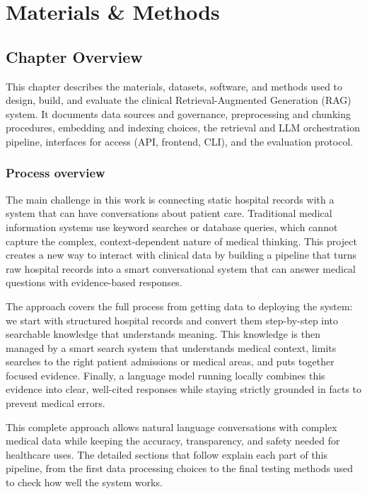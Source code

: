 \chapter{Materials \& Methods}

\section{Chapter Overview}
This chapter describes the materials, datasets, software, and methods used to design, build, and evaluate the clinical Retrieval-Augmented Generation (RAG) system. It documents data sources and governance, preprocessing and chunking procedures, embedding and indexing choices, the retrieval and LLM orchestration pipeline, interfaces for access (API, frontend, CLI), and the evaluation protocol.

\subsection{Process overview}
The main challenge in this work is connecting static hospital records with a system that can have conversations about patient care. Traditional medical information systems use keyword searches or database queries, which cannot capture the complex, context-dependent nature of medical thinking. This project creates a new way to interact with clinical data by building a pipeline that turns raw hospital records into a smart conversational system that can answer medical questions with evidence-based responses.


The approach covers the full process from getting data to deploying the system: we start with structured hospital records and convert them step-by-step into searchable knowledge that understands meaning. This knowledge is then managed by a smart search system that understands medical context, limits searches to the right patient admissions or medical areas, and puts together focused evidence. Finally, a language model running locally combines this evidence into clear, well-cited responses while staying strictly grounded in facts to prevent medical errors.

This complete approach allows natural language conversations with complex medical data while keeping the accuracy, transparency, and safety needed for healthcare uses. The detailed sections that follow explain each part of this pipeline, from the first data processing choices to the final testing methods used to check how well the system works.



